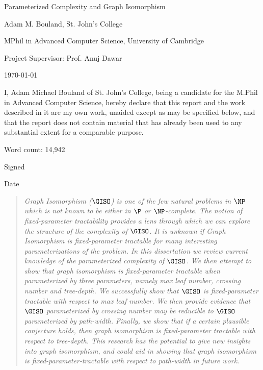 \documentclass[11pt]{report}
\begin{document}
	
\thispagestyle{empty}

\centerline{\LARGE Parameterized Complexity and Graph Isomorphism}
\vspace{2em}
\centerline{\Large Adam M. Bouland, St. John's College}
\centerline{\Large MPhil in Advanced Computer Science, University of Cambridge}
\centerline{\Large Project Supervisor: Prof. Anuj Dawar}
\centerline{\Large \today}
\vspace{1em}
\vspace{1em}


\newpage
\thispagestyle{empty}

I, Adam Michael Bouland of St. John's College, being a candidate for the M.Phil in Advanced Computer Science, hereby declare that this report and the work described in it are my own work, unaided except as may be specified below, and that the report does not contain material that has already been used to any substantial extent for a comparable purpose.

Word count: 14,942

Signed

Date 





\begin{abstract}
\textsl{Graph Isomorphism ($\GISO$) is one of the few natural problems in $\NP$ which is not known to be either in $\P$ or $\NP$-complete. The notion of fixed-parameter tractability provides a lens through which we can explore the structure of the complexity of $\GISO$. It is unknown if Graph Isomorphism is fixed-parameter tractable for many interesting parameterizations of the problem. In this dissertation we review current knowledge of the parameterized complexity of $\GISO$. We then attempt to show that graph isomorphism is fixed-parameter tractable when parameterized by three parameters, namely max leaf number, crossing number and tree-depth. We successfully show that  $\GISO$ is fixed-parameter tractable with respect to max leaf number.  We then provide evidence that $\GISO$ parameterized by crossing number may be reducible to $\GISO$ parameterized by path-width.  Finally, we show that if a certain plausible conjecture holds, then graph isomorphism is fixed-parameter tractable with respect to tree-depth. This research has the potential to give new insights into graph isomorphism, and could aid in showing that graph isomorphism is fixed-parameter-tractable with respect to path-width in future work.} 
\end{abstract}
\end{document}
